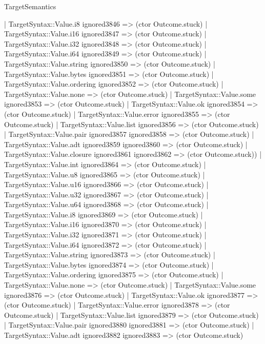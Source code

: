 \begin{lexlean}{TargetSemantics}
\begin{semanticmodule}
{                | TargetSyntax::Value.i8 ignored3846 => (ctor Outcome.stuck)
                | TargetSyntax::Value.i16 ignored3847 => (ctor Outcome.stuck)
                | TargetSyntax::Value.i32 ignored3848 => (ctor Outcome.stuck)
                | TargetSyntax::Value.i64 ignored3849 => (ctor Outcome.stuck)
                | TargetSyntax::Value.string ignored3850 => (ctor Outcome.stuck)
                | TargetSyntax::Value.bytes ignored3851 => (ctor Outcome.stuck)
                | TargetSyntax::Value.ordering ignored3852 => (ctor Outcome.stuck)
                | TargetSyntax::Value.none => (ctor Outcome.stuck)
                | TargetSyntax::Value.some ignored3853 => (ctor Outcome.stuck)
                | TargetSyntax::Value.ok ignored3854 => (ctor Outcome.stuck)
                | TargetSyntax::Value.error ignored3855 => (ctor Outcome.stuck)
                | TargetSyntax::Value.list ignored3856 => (ctor Outcome.stuck)
                | TargetSyntax::Value.pair ignored3857 ignored3858 => (ctor Outcome.stuck)
                | TargetSyntax::Value.adt ignored3859 ignored3860 => (ctor Outcome.stuck)
                | TargetSyntax::Value.closure ignored3861 ignored3862 => (ctor Outcome.stuck))
              | TargetSyntax::Value.int ignored3864 => (ctor Outcome.stuck)
              | TargetSyntax::Value.u8 ignored3865 => (ctor Outcome.stuck)
              | TargetSyntax::Value.u16 ignored3866 => (ctor Outcome.stuck)
              | TargetSyntax::Value.u32 ignored3867 => (ctor Outcome.stuck)
              | TargetSyntax::Value.u64 ignored3868 => (ctor Outcome.stuck)
              | TargetSyntax::Value.i8 ignored3869 => (ctor Outcome.stuck)
              | TargetSyntax::Value.i16 ignored3870 => (ctor Outcome.stuck)
              | TargetSyntax::Value.i32 ignored3871 => (ctor Outcome.stuck)
              | TargetSyntax::Value.i64 ignored3872 => (ctor Outcome.stuck)
              | TargetSyntax::Value.string ignored3873 => (ctor Outcome.stuck)
              | TargetSyntax::Value.bytes ignored3874 => (ctor Outcome.stuck)
              | TargetSyntax::Value.ordering ignored3875 => (ctor Outcome.stuck)
              | TargetSyntax::Value.none => (ctor Outcome.stuck)
              | TargetSyntax::Value.some ignored3876 => (ctor Outcome.stuck)
              | TargetSyntax::Value.ok ignored3877 => (ctor Outcome.stuck)
              | TargetSyntax::Value.error ignored3878 => (ctor Outcome.stuck)
              | TargetSyntax::Value.list ignored3879 => (ctor Outcome.stuck)
              | TargetSyntax::Value.pair ignored3880 ignored3881 => (ctor Outcome.stuck)
              | TargetSyntax::Value.adt ignored3882 ignored3883 => (ctor Outcome.stuck)
}
\end{semanticmodule}
\end{lexlean}
